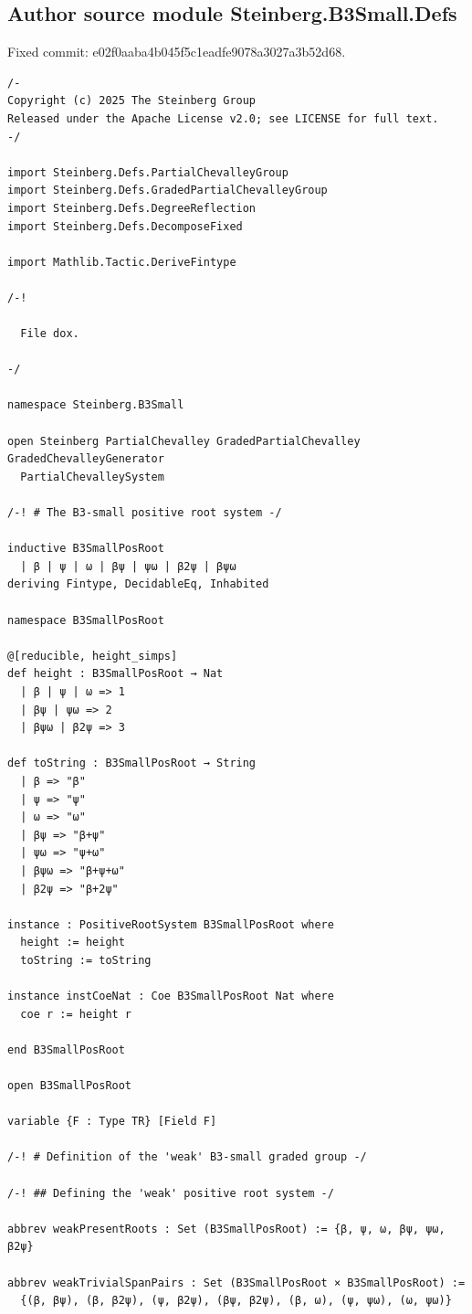 \documentclass[10pt,a4paper]{article}
\begin{document}
\subsection*{Author source module Steinberg.B3Small.Defs}
\noindent Fixed commit: e02f0aaba4b045f5c1eadfe9078a3027a3b52d68.
\begin{Verbatim}
/-
Copyright (c) 2025 The Steinberg Group
Released under the Apache License v2.0; see LICENSE for full text.
-/

import Steinberg.Defs.PartialChevalleyGroup
import Steinberg.Defs.GradedPartialChevalleyGroup
import Steinberg.Defs.DegreeReflection
import Steinberg.Defs.DecomposeFixed

import Mathlib.Tactic.DeriveFintype

/-!

  File dox.

-/

namespace Steinberg.B3Small

open Steinberg PartialChevalley GradedPartialChevalley GradedChevalleyGenerator
  PartialChevalleySystem

/-! # The B3-small positive root system -/

inductive B3SmallPosRoot
  | β | ψ | ω | βψ | ψω | β2ψ | βψω
deriving Fintype, DecidableEq, Inhabited

namespace B3SmallPosRoot

@[reducible, height_simps]
def height : B3SmallPosRoot → Nat
  | β | ψ | ω => 1
  | βψ | ψω => 2
  | βψω | β2ψ => 3

def toString : B3SmallPosRoot → String
  | β => "β"
  | ψ => "ψ"
  | ω => "ω"
  | βψ => "β+ψ"
  | ψω => "ψ+ω"
  | βψω => "β+ψ+ω"
  | β2ψ => "β+2ψ"

instance : PositiveRootSystem B3SmallPosRoot where
  height := height
  toString := toString

instance instCoeNat : Coe B3SmallPosRoot Nat where
  coe r := height r

end B3SmallPosRoot

open B3SmallPosRoot

variable {F : Type TR} [Field F]

/-! # Definition of the 'weak' B3-small graded group -/

/-! ## Defining the 'weak' positive root system -/

abbrev weakPresentRoots : Set (B3SmallPosRoot) := {β, ψ, ω, βψ, ψω, β2ψ}

abbrev weakTrivialSpanPairs : Set (B3SmallPosRoot × B3SmallPosRoot) :=
  {(β, βψ), (β, β2ψ), (ψ, β2ψ), (βψ, β2ψ), (β, ω), (ψ, ψω), (ω, ψω)}


\end{Verbatim}
\end{document}
